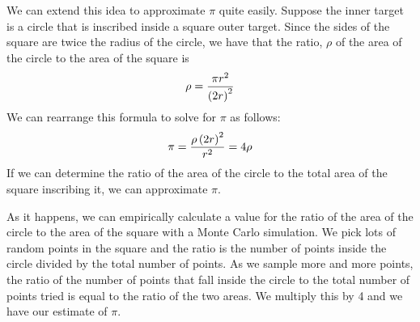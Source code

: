 \documentclass[letterpaper,10pt,openany,oneside]{sphinxmanual}
\begin{document}
We can extend this idea to approximate $\pi$ quite easily. Suppose the inner target
is a circle that is inscribed inside a square outer target. Since the sides of the
square are twice the radius of the circle, we have that the ratio, $\rho$
of the area of the circle to the area of the square is
\begin{gather}
\begin{split}\rho = \frac{\pi {r}^2}{{\left( 2r \right)^2}}\end{split}\notag
\end{gather}
We can rearrange this formula to solve for $\pi$ as follows:
\begin{gather}
\begin{split}\pi = \frac{\rho\left( 2r \right)^2}{r^2} = 4\rho\end{split}\notag
\end{gather}
If we can determine the ratio of the area of the circle to the total area of the square
inscribing it, we can approximate $\pi$.

As it happens, we can empirically calculate a value for the ratio of the area of the circle
to the area of the square with a Monte Carlo simulation. We pick lots of random
points in the square and the ratio is the number of points inside the circle
divided by the total number of points.  As we sample more and more points, the ratio of the
number of points that fall inside the circle to the total number of points tried is
equal to the ratio of the two areas. We multiply this by 4 and we have our estimate of $\pi$.
\end{document}
